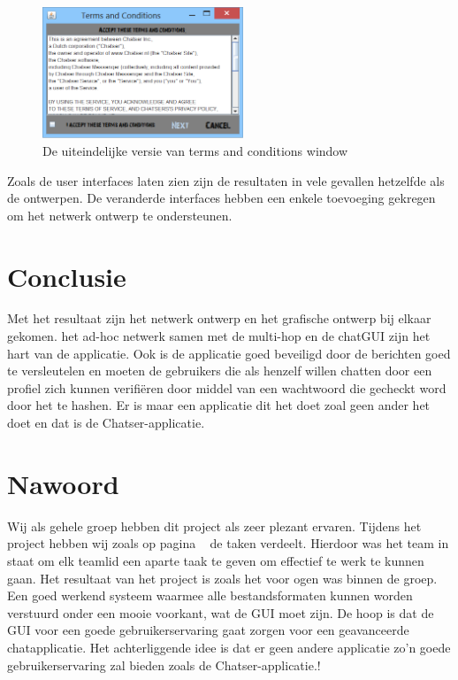 \documentclass[12pt]{article}
\begin{document}
\begin{figure}[ht]
\begin{center}
\includegraphics[width = 60mm]{Terms_Conditions1}
\caption{De uiteindelijke versie van terms and conditions window}
\label{figure016}
\end{center}
\end{figure}


\noindent Zoals de user interfaces laten zien zijn de resultaten in vele gevallen hetzelfde als de ontwerpen. De veranderde interfaces hebben een enkele toevoeging gekregen om het netwerk ontwerp te ondersteunen.
\newpage

\section{Conclusie}
Met het resultaat zijn het netwerk ontwerp en het grafische ontwerp bij elkaar gekomen.  het ad-hoc netwerk samen met de multi-hop en de chatGUI zijn het hart van de applicatie.  Ook is de applicatie goed beveiligd door de berichten goed te versleutelen en moeten de gebruikers die als henzelf willen chatten door een profiel zich kunnen verifi\"eren door middel van een wachtwoord die gecheckt word door het te hashen. Er is maar een applicatie dit het doet zoal geen ander het doet en dat is de Chatser-applicatie\small\textcopyright.

\newpage

\section{Nawoord}
Wij als gehele groep hebben dit project als zeer plezant ervaren. Tijdens het project hebben wij zoals op pagina ~\pageref{taken} de taken verdeelt. Hierdoor was het team in staat om elk teamlid een aparte taak te geven om effectief te werk te kunnen gaan. Het resultaat van het project is zoals het voor ogen was binnen de groep. Een goed werkend systeem waarmee alle bestandsformaten kunnen  worden verstuurd onder een mooie voorkant, wat de GUI moet zijn. De hoop is dat de GUI voor een goede gebruikerservaring gaat zorgen voor een geavanceerde chatapplicatie. Het achterliggende idee is dat er geen andere applicatie zo'n goede gebruikerservaring zal bieden zoals de Chatser-applicatie\small.\textcopyright!

\newpage



\end{document}
